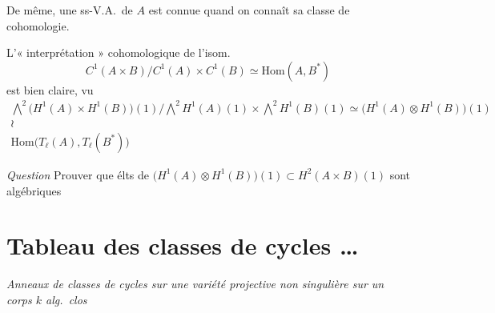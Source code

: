 \documentclass[11pt,a4paper]{article}
\begin{document}
De même, une ss-V.A.\ de $A$ est connue quand on connaît sa classe de
cohomologie.

L'« interprétation » cohomologique de l'isom.
\[
  C^{1}(A \times B) / C^{1}(A) \times C^{1}(B) \simeq \mathrm{Hom}(A, B^{*})
\]
est bien claire, vu
\[
  \begin{array}{c}
    \bigwedge^{2}\bigl(H^{1}(A) \times H^{1}(B)\bigr)(1) \big/
    \bigwedge^{2} H^{1}(A)(1) \times \bigwedge^{2} H^{1}(B)(1) \simeq
    \bigl(H^{1}(A) \otimes H^{1}(B)\bigr)(1) \\
    \wr \\
    \mathrm{Hom}\bigl(T_{\ell}(A), T_{\ell}(B^{*})\bigr)
  \end{array}
\]

\emph{Question} Prouver que \ill{} \ill{} élts de
$\bigl(H^{1}(A) \otimes H^{1}(B)\bigr)(1) \subset H^{2}(A \times B)(1)$ sont
algébriques

\section{Tableau des classes de cycles …}

\emph{Anneaux de classes de cycles sur une variété projective non singulière
sur un corps $k$ alg.\ clos}

\end{document}
